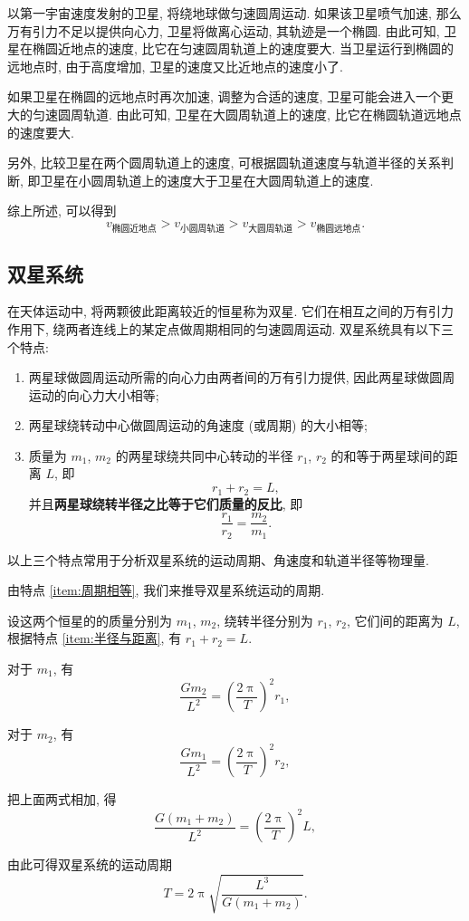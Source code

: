 \documentclass[UTF8,openany,fontset=fandol]{ctexbook}
\theoremstyle{chinesetextbook}
\begin{document}
以第一宇宙速度发射的卫星, 将绕地球做匀速圆周运动. 如果该卫星喷气加速, 那么万有引力不足以提供向心力, 卫星将做离心运动, 其轨迹是一个椭圆. 由此可知, 卫星在椭圆近地点的速度, 比它在匀速圆周轨道上的速度要大. 当卫星运行到椭圆的远地点时, 由于高度增加, 卫星的速度又比近地点的速度小了.

如果卫星在椭圆的远地点时再次加速, 调整为合适的速度, 卫星可能会进入一个更大的匀速圆周轨道. 由此可知, 卫星在大圆周轨道上的速度, 比它在椭圆轨道远地点的速度要大.

另外, 比较卫星在两个圆周轨道上的速度, 可根据圆轨道速度与轨道半径的关系判断, 即卫星在小圆周轨道上的速度大于卫星在大圆周轨道上的速度.

综上所述, 可以得到
\[
v_\text{椭圆近地点}>v_\text{小圆周轨道}>v_\text{大圆周轨道}>v_\text{椭圆远地点}.
\]
\subsection{双星系统}
在天体运动中, 将两颗彼此距离较近的恒星称为双星. 它们在相互之间的万有引力作用下, 绕两者连线上的某定点做周期相同的匀速圆周运动. 双星系统具有以下三个特点:
\begin{enumerate}[itemsep=0pt]
\item 两星球做圆周运动所需的向心力由两者间的万有引力提供, 因此两星球做圆周运动的向心力大小相等;
\item 两星球绕转动中心做圆周运动的角速度 (或周期) 的大小相等;\label{item:周期相等}
\item 质量为 $m_1$, $m_2$ 的两星球绕共同中心转动的半径 $r_1$, $r_2$ 的和等于两星球间的距离 $L$, 即
\[
r_1+r_2=L,
\]
并且\textbf{两星球绕转半径之比等于它们质量的反比}, 即
\[
\frac{r_1}{r_2}=\frac{m_2}{m_1}.
\]
\label{item:半径与距离}
\end{enumerate}

以上三个特点常用于分析双星系统的运动周期、角速度和轨道半径等物理量.

由特点 \ref{item:周期相等}, 我们来推导双星系统运动的周期.

设这两个恒星的的质量分别为 $m_1$, $m_2$, 绕转半径分别为 $r_1$, $r_2$, 它们间的距离为 $L$, 根据特点 \ref{item:半径与距离}, 有 $r_1+r_2=L$.

对于 $m_1$, 有
\[
\frac{Gm_2}{L^2}=\left(\frac{2\uppi}{T}\right)^2r_1,
\]

对于 $m_2$, 有
\[
\frac{Gm_1}{L^2}=\left(\frac{2\uppi}{T}\right)^2r_2,
\]

把上面两式相加, 得
\[
\frac{G(m_1+m_2)}{L^2}=\left(\frac{2\uppi}{T}\right)^2L,
\]

由此可得双星系统的运动周期
\[
T=2\uppi\sqrt{\frac{L^3}{G(m_1+m_2)}}.
\]
\end{document}
